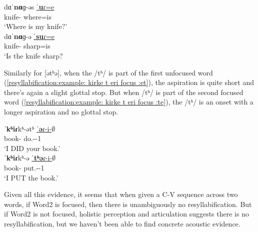 \begin{exe}
	\ex 
	\begin{xlist}
		\ex \gll dɑˈ\textbf{nɑ}ɡ-əs  \underline{ˈ\textbf{u}ɾ=e} \\
		knife-{\possFsg} where=is\\
		\trans `Where is my knife?'   \label{resyllabification:example: danage s u:es u} \\
		\ex \gll dɑˈ\textbf{nɑ}ɡ-ə  \underline{ˈ\textbf{su}ɾ=e} \\
		knife-{} sharp=is\\
		\trans `Is the knife sharp?   \label{resyllabification:example: danage s u:e su} \\
	\end{xlist}
\end{exe}


Similarly for [ətʰə], when the /tʰ/ is part of the first unfocused word (\ref{resyllabification:example: kirke t eri focus :et}), the aspiration is quite short and there's again a slight glottal stop. But when /tʰ/ is part of the second focused word (\ref{resyllabification:example: kirke t eri focus :te}), the /tʰ/ is an onset with a longer aspiration and no glottal stop. 

\begin{exe}
	\ex 
	\begin{xlist}
		\ex \gll ˈ\textbf{kʰiɾ}kʰ-ətʰ  \underline{ˈ\textbf{ə}ɾ-i-$\emptyset$} \\
		book-{\possSsg} do.{\aorperf}-{\pst}-1{\sg} \\
		\trans `I DID your book.' \label{resyllabification:example: kirke t eri focus :et} \\
		\armenian{Գիրքդ ըրի՛։}
		\ex \gll ˈ\textbf{kʰiɾ}kʰ-ə  \underline{ˈ\textbf{tʰə}ɾ-i-$\emptyset$} \\
		book-{} put.{\aorother}-{\pst}-1{\sg} \\
		\trans `I PUT the book.' \label{resyllabification:example: kirke t eri focus :te} \\
		\armenian{Գիրքը դրի՛։}
	\end{xlist}
\end{exe}

Given all this evidence, it seems that when given a C-V sequence across two words, if Word2  is focused, then there is unambiguously no resyllabification. But if Word2 is not focused,  holistic perception and articulation suggests there is no resyllabification, but we haven't been able to find concrete acoustic evidence. 

